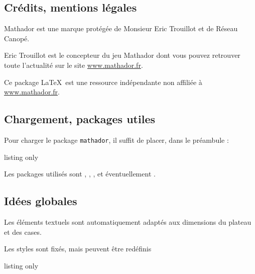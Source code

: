 \documentclass[11pt,a4paper]{ltxdoc}
\begin{document}
\subsection{Crédits, mentions légales}

\og \textsf{Mathador} est une marque protégée de Monsieur Eric Trouillot et de Réseau Canopé.

Eric Trouillot est le concepteur du jeu \textsf{Mathador} dont vous pouvez retrouver toute l’actualité sur le site \url{www.mathador.fr}.

Ce package \LaTeX\ est une ressource indépendante non affiliée à \url{www.mathador.fr}. \fg

\subsection{Chargement, packages utiles}

Pour charger le package \texttt{mathador}, il suffit de placer, dans le préambule :

\begin{DemoCode}{listing only}
\usepackage{mathador}
\usepackage[bm]{mathador}
\usepackage[babel]{mathador}
\end{DemoCode}

Les packages utilisés sont , , ,  et éventuellement .

\subsection{Idées globales}

Les éléments textuels sont automatiquement adaptés aux dimensions du plateau et des cases.

Les styles sont fixés, mais peuvent être redéfinis

\begin{DemoCode}{listing only}
\end{DemoCode}
\end{document}
